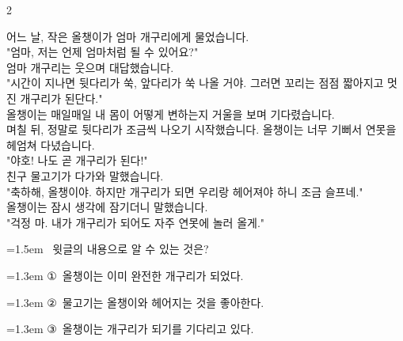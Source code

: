 \documentclass[12pt, a4paper]{article}
\begin{document}
\begin{multicols}{2}


\vspace{1mm}
\vspace{0.5mm}

\begin{passagebox}
\noindent{}어느 날, 작은 올챙이가 엄마 개구리에게 물었습니다. \\
"엄마, 저는 언제 엄마처럼 될 수 있어요?" \\
엄마 개구리는 웃으며 대답했습니다. \\
"시간이 지나면 뒷다리가 쑥, 앞다리가 쑥 나올 거야. 그러면 꼬리는 점점 짧아지고 멋진 개구리가 된단다." \\
올챙이는 매일매일 내 몸이 어떻게 변하는지 거울을 보며 기다렸습니다. \\
며칠 뒤, 정말로 뒷다리가 조금씩 나오기 시작했습니다. 올챙이는 너무 기뻐서 연못을 헤엄쳐 다녔습니다. \\
"야호! 나도 곧 개구리가 된다!" \\
친구 물고기가 다가와 말했습니다. \\
"축하해, 올챙이야. 하지만 개구리가 되면 우리랑 헤어져야 하니 조금 슬프네." \\
올챙이는 잠시 생각에 잠기더니 말했습니다. \\
"걱정 마. 내가 개구리가 되어도 자주 연못에 놀러 올게."
\end{passagebox}
\vspace{1mm}

\noindent\begin{minipage}{\columnwidth}
\vspace{2mm}
{\hangindent=1.5em  ~윗글의 내용으로 알 수 있는 것은?\par}

\vspace{0.5mm}
{\hangindent=1.3em  \noindent\hspace{0.3em}①~올챙이는 이미 완전한 개구리가 되었다.\par}
{\hangindent=1.3em  \noindent\hspace{0.3em}②~물고기는 올챙이와 헤어지는 것을 좋아한다.\par}
{\hangindent=1.3em  \noindent\hspace{0.3em}③~올챙이는 개구리가 되기를 기다리고 있다.\par}
\vspace{4mm}
\end{minipage}
\par


\end{multicols}
\end{document}
